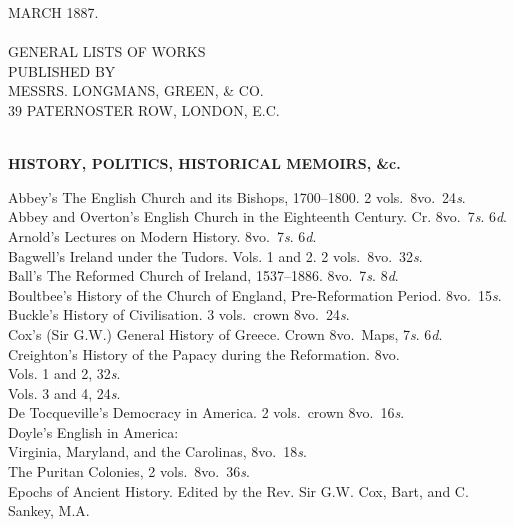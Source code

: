 \documentclass[letterpaper,12pt,oneside,openany]{memoir}
\newcommand{\D}{\hspace*{5mm}}
\begin{document}
\pagestyle{empty}
\begin{center}
MARCH 1887.\\[3mm]
\makebox[2in]{\hrulefill}\\[2mm]
{\Large GENERAL LISTS OF WORKS}\\
{\tiny PUBLISHED BY}\\
{\large MESSRS\@. LONGMANS, GREEN, \& CO.}\\
{\small 39 PATERNOSTER ROW, LONDON, E.C.}\\
\makebox[2in]{\hrulefill}\\[2mm]
\end{center}
\begin{footnotesize}
\begin{center}
\textbf{HISTORY, POLITICS, HISTORICAL MEMOIRS, \&c.}
\end{center}
Abbey's The English Church and its Bishops, 1700--1800. 2 vols.\ 8vo.\ 24\textit{s}.\\
Abbey and Overton's English Church in the Eighteenth Century. Cr. 8vo.\ 7\textit{s}. 6\textit{d}.\\
Arnold's Lectures on Modern History. 8vo.\ 7\textit{s}. 6\textit{d}.\\
Bagwell's Ireland under the Tudors. Vols. 1 and 2. 2 vols.\ 8vo.\ 32\textit{s}.\\
Ball's The Reformed Church of Ireland, 1537--1886. 8vo.\ 7\textit{s}. 8\textit{d}.\\
Boultbee's History of the Church of England, Pre-Reformation Period. 8vo.\ 15\textit{s}.\\
Buckle's History of Civilisation. 3 vols.\ crown 8vo.\ 24\textit{s}.\\
Cox's (Sir G.W.) General History of Greece. Crown 8vo.\ Maps, 7\textit{s}. 6\textit{d}.\\
Creighton's History of the Papacy during the Reformation. 8vo.\\
\D Vols. 1 and 2, 32\textit{s}.\\
\D Vols. 3 and 4, 24\textit{s}.\\
De Tocqueville's Democracy in America. 2 vols.\ crown 8vo.\ 16\textit{s}.\\
Doyle's English in America:\\
\D Virginia, Maryland, and the Carolinas, 8vo.\ 18\textit{s}.\\
\D The Puritan Colonies, 2 vols.\ 8vo.\ 36\textit{s}.\\
Epochs of Ancient History. Edited by the Rev. Sir G.W. Cox, Bart, and C. Sankey, M.A.\\

\end{footnotesize}
\end{document}
